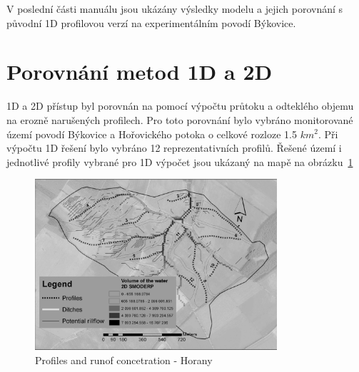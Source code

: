 %




V poslední části manuálu jsou ukázány výsledky modelu \smod a jejich porovnání s původní 1D profilovou verzí na experimentálním povodí Býkovice. 



\setcounter{section}{0}
\section{Porovnání metod 1D a 2D} \label{porovnani1D2D}

1D a 2D přístup byl porovnán na pomocí výpočtu průtoku a odteklého objemu na erozně narušených profilech. Pro toto porovnání bylo vybráno monitorované území povodí Býkovice a Hořovického potoka o celkové rozloze 1.5 $km^{2}$. Při výpočtu 1D řešení bylo vybráno 12 reprezentativních profilů. Řešené území i jednotlivé profily vybrané pro 1D výpočet jsou ukázaný na mapě na obrázku~\ref{fig:horany1}



\begin{figure}[ht!]
\centering
\includegraphics[width=0.8\textwidth]{img/horany_print3.jpg}
\caption{Profiles and runof concetration - Horany}
\label{fig:horany1}
\end{figure}\FloatBarrier

